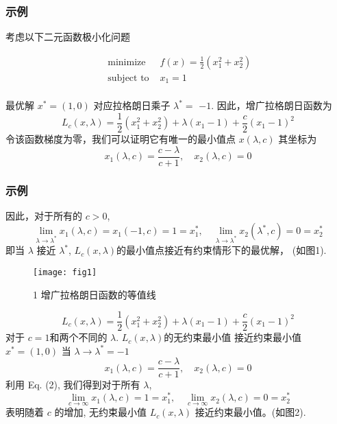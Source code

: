 \documentclass[handout,10pt]{beamer} %
\begin{document}
\begin{frame}
\frametitle{示例}

考虑以下二元函数极小化问题
\begin{center}

\begin{equation}
		\begin{array}{ll}
		\text{ minimize } & f(x)=\frac{1}{2}\left(x_{1}^{2}+x_{2}^{2}\right) \\
		\text { subject to } & x_{1}=1\\
		
		\end{array}
	\end{equation}
\end{center}
最优解 $x^{*}=(1,0)$ 对应拉格朗日乘子 $\lambda^{*}=$ $-1 .$ 因此，增广拉格朗日函数为
$$
L_{c}(x, \lambda)=\frac{1}{2}\left(x_{1}^{2}+x_{2}^{2}\right)+\lambda\left(x_{1}-1\right)+\frac{c}{2}\left(x_{1}-1\right)^{2}
$$
令该函数梯度为零，我们可以证明它有唯一的最小值点 $x(\lambda, c)$ 其坐标为
\begin{equation}
x_{1}(\lambda, c)=\frac{c-\lambda}{c+1}, \quad x_{2}(\lambda, c)=0
\end{equation}
\end{frame}




\begin{frame}
\frametitle{示例}
因此，对于所有的 $c>0$,
$$
\lim _{\lambda \rightarrow \lambda^{*}} x_{1}(\lambda, c)=x_{1}(-1, c)=1=x_{1}^{*}, \quad \lim _{\lambda \rightarrow \lambda^{*}} x_{2}\left(\lambda^{*}, c\right)=0=x_{2}^{*}
$$
即当 $\lambda$ 接近 $\lambda^{*}$,  $L_{c}(x, \lambda)$的最小值点接近有约束情形下的最优解， (如图1).
\end{frame}

\begin{frame}
\begin{figure}
\texttt{[image: fig1]}
\caption{1 增广拉格朗日函数的等值线}
\end{figure}
\end{frame}


\begin{frame}
$$
L_{c}(x, \lambda)=\frac{1}{2}\left(x_{1}^{2}+x_{2}^{2}\right)+\lambda\left(x_{1}-1\right)+\frac{c}{2}\left(x_{1}-1\right)^{2}
$$
对于 $c=1$和两个不同的 $\lambda$.  $L_{c}(x, \lambda)$的无约束最小值 接近约束最小值$x^{*}=(1,0)$ 当 $\lambda \rightarrow \lambda^{*}=-1$\\
\begin{equation}\tag{2}
	x_{1}(\lambda, c)=\frac{c-\lambda}{c+1}, \quad x_{2}(\lambda, c)=0
\end{equation}
利用 Eq. (2), 我们得到对于所有 $\lambda$,
$$
\lim _{c \rightarrow \infty} x_{1}(\lambda, c)=1=x_{1}^{*}, \quad \lim _{c \rightarrow \infty} x_{2}(\lambda, c)=0=x_{2}^{*}
$$
表明随着 $c$ 的增加, 无约束最小值 $L_{c}(x, \lambda)$ 接近约束最小值。(如图2).
\end{frame}
\end{document}
